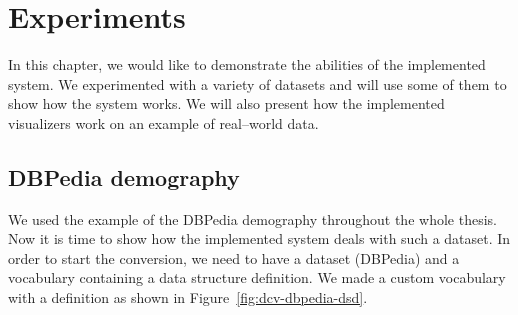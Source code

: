 \chapter{Experiments}
\label{ch:experiments}

In this chapter, we would like to demonstrate the abilities of the implemented system. We
experimented with a variety of datasets and will use some of them to show how 
the system works. We will also present how the implemented visualizers work on 
an example of real--world data.

\section{DBPedia demography}
We used the example of the DBPedia demography throughout the whole thesis. Now 
it is time to show how the implemented system deals with such a dataset. In 
order to start the conversion, we need to have a dataset (DBPedia) and a 
vocabulary containing a data structure definition. We made a custom vocabulary 
with a definition as shown in Figure~\ref{fig:dcv-dbpedia-dsd}.

